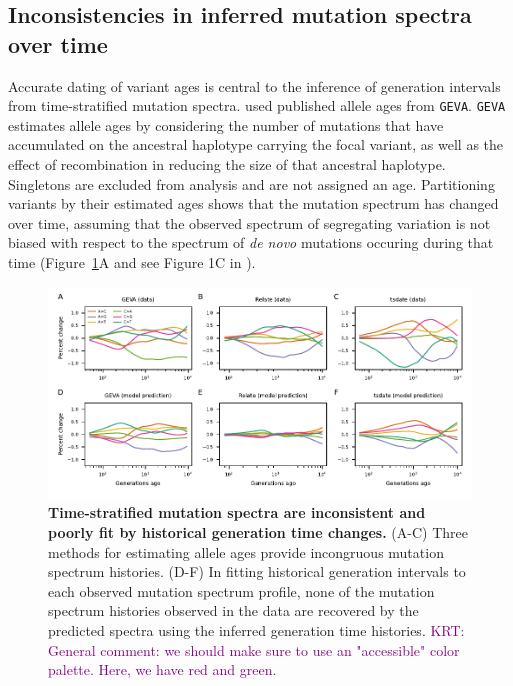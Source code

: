 \documentclass[]{article}
\newcommand{\krtcomment}[1]{{\textcolor{purple}{KRT: #1}}}
\newcommand{\GEVA}{\texttt{GEVA}\xspace}
\begin{document}
\subsection*{Inconsistencies in inferred mutation spectra over time}

Accurate dating of variant ages is central to the inference of generation
intervals from time-stratified mutation spectra. \citet{wang2023human} used
published allele ages from \GEVA \citep{albers2020dating}. \GEVA estimates
allele ages by considering the number of mutations that have accumulated on the
ancestral haplotype carrying the focal variant, as well as the effect of
recombination in reducing the size of that ancestral haplotype. Singletons are
excluded from analysis and are not assigned an age. Partitioning variants by
their estimated ages shows that the mutation spectrum has changed over time,
assuming that the observed spectrum of segregating variation is not biased with
respect to the spectrum of \emph{de novo} mutations occuring during that time
(Figure~\ref{fig:spectrum-ages}A and see Figure 1C in \citet{wang2023human}).

\begin{figure}[tb!]
    \centering
    \includegraphics{../plots/fig1.pdf}
    \caption{
        \textbf{Time-stratified mutation spectra are inconsistent and poorly
        fit by historical generation time changes.} (A-C) Three methods for
        estimating allele ages provide incongruous mutation spectrum histories.
        (D-F) In fitting historical generation intervals to each observed
        mutation spectrum profile, none of the mutation spectrum histories
        observed in the data are recovered by the predicted spectra using the
        inferred generation time histories.
        \krtcomment{General comment: we should make sure to use an "accessible" color palette. Here, we have red and green.}
    }
    \label{fig:spectrum-ages}
\end{figure}
\end{document}
